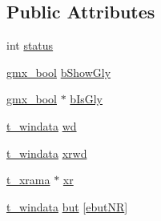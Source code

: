 \subsection*{\-Public \-Attributes}
\begin{DoxyCompactItemize}
\item 
int \hyperlink{structt__app_ad5b1d949670fd928b0906cf62f8b5564}{status}
\item 
\hyperlink{include_2types_2simple_8h_a8fddad319f226e856400d190198d5151}{gmx\-\_\-bool} \hyperlink{structt__app_a3031690cacedb62decff61cc1f6e1477}{b\-Show\-Gly}
\item 
\hyperlink{include_2types_2simple_8h_a8fddad319f226e856400d190198d5151}{gmx\-\_\-bool} $\ast$ \hyperlink{structt__app_a95179fd244eecdacd9ddefb7812c63dd}{b\-Is\-Gly}
\item 
\hyperlink{structt__windata}{t\-\_\-windata} \hyperlink{structt__app_a889fe7c38e922c9e02944f716df2b884}{wd}
\item 
\hyperlink{structt__windata}{t\-\_\-windata} \hyperlink{structt__app_af7a64990f5dd04b880cb6d740395c8f9}{xrwd}
\item 
\hyperlink{structt__xrama}{t\-\_\-xrama} $\ast$ \hyperlink{structt__app_ae5e277e0165214fe49cced71b0e76fa8}{xr}
\item 
\hyperlink{structt__windata}{t\-\_\-windata} \hyperlink{structt__app_acff391c03a72b5f2666a3e559c90bfb1}{but} \mbox{[}\hyperlink{g__xrama_8c_af96be3e9de53e065a22cd7978e05dc5ca299e465a0674c25e6fc1714c8d9225a7}{ebut\-N\-R}\mbox{]}
\end{DoxyCompactItemize}


